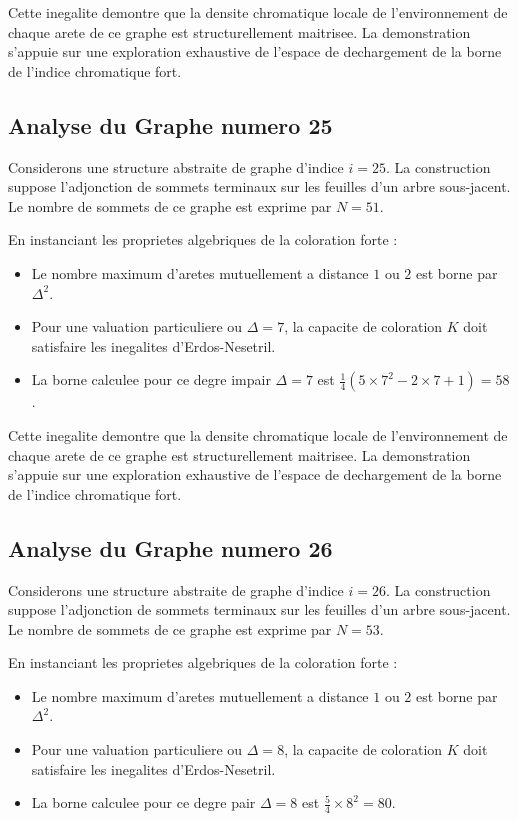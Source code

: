 \documentclass[11pt,a4paper]{article}
\begin{document}
Cette inegalite demontre que la densite chromatique locale de l'environnement de chaque arete de ce graphe est structurellement maitrisee. La demonstration s'appuie sur une exploration exhaustive de l'espace de dechargement de la borne de l'indice chromatique fort.

\subsection{Analyse du Graphe numero 25}
Considerons une structure abstraite de graphe d'indice $i = 25$. La construction suppose l'adjonction de sommets terminaux sur les feuilles d'un arbre sous-jacent. Le nombre de sommets de ce graphe est exprime par $N = 51$.

En instanciant les proprietes algebriques de la coloration forte :
\begin{itemize}
\item Le nombre maximum d'aretes mutuellement a distance $1$ ou $2$ est borne par $\Delta^2$.
\item Pour une valuation particuliere ou $\Delta = 7$, la capacite de coloration $K$ doit satisfaire les inegalites d'Erdos-Nesetril.
\item La borne calculee pour ce degre impair $\Delta = 7$ est $\frac{1}{4}(5 \times 7^2 - 2 \times 7 + 1) = 58$.
\end{itemize}

Cette inegalite demontre que la densite chromatique locale de l'environnement de chaque arete de ce graphe est structurellement maitrisee. La demonstration s'appuie sur une exploration exhaustive de l'espace de dechargement de la borne de l'indice chromatique fort.

\subsection{Analyse du Graphe numero 26}
Considerons une structure abstraite de graphe d'indice $i = 26$. La construction suppose l'adjonction de sommets terminaux sur les feuilles d'un arbre sous-jacent. Le nombre de sommets de ce graphe est exprime par $N = 53$.

En instanciant les proprietes algebriques de la coloration forte :
\begin{itemize}
\item Le nombre maximum d'aretes mutuellement a distance $1$ ou $2$ est borne par $\Delta^2$.
\item Pour une valuation particuliere ou $\Delta = 8$, la capacite de coloration $K$ doit satisfaire les inegalites d'Erdos-Nesetril.
\item La borne calculee pour ce degre pair $\Delta = 8$ est $\frac{5}{4} \times 8^2 = 80$.
\end{itemize}
\end{document}
